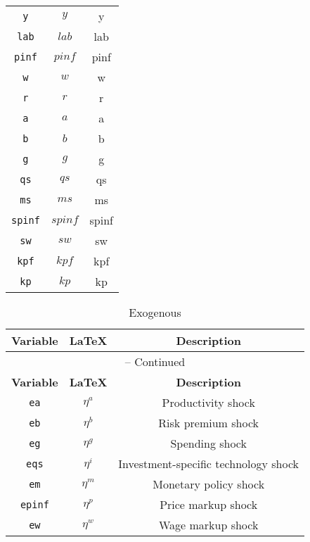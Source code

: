 \begin{center}
\begin{longtable}{ccc}
\texttt{y} & $y$ & y\\
\texttt{lab} & $lab$ & lab\\
\texttt{pinf} & $pinf$ & pinf\\
\texttt{w} & $w$ & w\\
\texttt{r} & $r$ & r\\
\texttt{a} & $a$ & a\\
\texttt{b} & $b$ & b\\
\texttt{g} & $g$ & g\\
\texttt{qs} & $qs$ & qs\\
\texttt{ms} & $ms$ & ms\\
\texttt{spinf} & $spinf$ & spinf\\
\texttt{sw} & $sw$ & sw\\
\texttt{kpf} & $kpf$ & kpf\\
\texttt{kp} & $kp$ & kp\\
\hline%
\end{longtable}
\end{center}
\begin{center}
\begin{longtable}{ccc}
\caption{Exogenous}\\%
\hline%
\multicolumn{1}{c}{\textbf{Variable}} &
\multicolumn{1}{c}{\textbf{\LaTeX}} &
\multicolumn{1}{c}{\textbf{Description}}\\%
\hline\hline%
\endfirsthead
\multicolumn{3}{c}{{\tablename} \thetable{} -- Continued}\\%
\hline%
\multicolumn{1}{c}{\textbf{Variable}} &
\multicolumn{1}{c}{\textbf{\LaTeX}} &
\multicolumn{1}{c}{\textbf{Description}}\\%
\hline\hline%
\endhead
\texttt{ea} & ${\eta^a}$ & Productivity shock\\
\texttt{eb} & ${\eta^b}$ & Risk premium shock\\
\texttt{eg} & ${\eta^g}$ & Spending shock\\
\texttt{eqs} & ${\eta^i}$ & Investment-specific technology shock\\
\texttt{em} & ${\eta^m}$ & Monetary policy shock\\
\texttt{epinf} & ${\eta^{p}}$ & Price markup shock\\
\texttt{ew} & ${\eta^{w}}$ & Wage markup shock\\
\hline%
\end{longtable}
\end{center}
